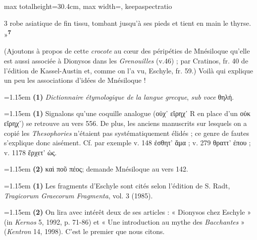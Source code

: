 \documentclass[11pt,twoside]{book}
\newcommand{\italique}[1]{\textit{#1}}
\newcommand{\marqueur}[1]{\textsuperscript{\color{rubricRed}\textbf{#1}}}
\begin{document}
\begin{adjustbox}{max totalheight=30.4cm, max width=\textwidth, keepaspectratio}
\begin{minipage}{\textwidth}
{\begin{multicols}{3}
robe asiatique de fin tissu, tombant jusqu'à ses pieds et tient en main le thyrse. »\marqueur{7}
\par\vspace{1.5pt}
\noindent (Ajoutons à propos de cette \italique{crocote} au cœur des péripéties de Mnésiloque qu'elle est aussi associée à Dionysos dans les \italique{Grenouilles} (v.46) ; par Cratinos, fr. 40 de l'édition de Kassel-Austin et, comme on l'a vu, Eschyle, fr. 59.)  Voilà qui explique un peu les associations d'idées de Mnésiloque !
\par\vspace{1.5pt}
\par\vspace{1.2pt}\par\nopagebreak\vspace{1pt}\noindent\hangindent=1.15em {\color{sepiaNote}\textbf{(1)}} \italique{Dictionnaire étymologique de la langue grecque}, \italique{sub voce} θηλή.
\par\vspace{1.5pt}
\noindent\hangindent=1.15em {\color{sepiaNote}\textbf{(1)}} Signalons qu'une coquille analogue (οὐχ᾽ εἴρηχ᾽ R en place d'un οὐκ εἴρηχ᾽) se retrouve au vers 556. De plus, les anciens manuscrits sur lesquels on a copié les \italique{Thesophories} n'étaient pas systématiquement élidés ; ce genre de fautes s'explique donc aisément. Cf. par exemple v. 148 ἐσθητ' ἅμα ; v. 279 θραττ' έπου ; v. 1178 ἔρχετ' ὡς.
\par\vspace{1.5pt}
\noindent\hangindent=1.15em {\color{sepiaNote}\textbf{(2)}} καὶ ποῦ πέος; demande Mnésiloque au vers 142.
\par\vspace{1.5pt}
\noindent\hangindent=1.15em {\color{sepiaNote}\textbf{(1)}} Les fragments d'Eschyle sont cités selon l'édition de S. Radt, \italique{Tragicorum Graecorum Fragmenta}, vol. 3 (1985).
\par\vspace{1.5pt}
\noindent\hangindent=1.15em {\color{sepiaNote}\textbf{(2)}} On lira avec intérêt deux de ses articles : « Dionysos chez Eschyle » (in \italique{Kernos} 5, 1992, p. 71-86) et « Une introduction au mythe des \italique{Bacchantes} » (\italique{Kentron} 14, 1998). C'est le premier que nous citons.
\par\vspace{1.5pt}

\end{multicols}}
\end{minipage}
\end{adjustbox}
\end{document}
